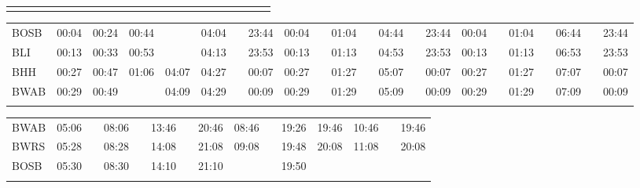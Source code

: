 \begin{center}
\begin{tabular}
\begin{tabular}
\begin{tabular}{!{\color{blaulilas}\vrule width 3pt}l!{\color{blaulilas}\vrule width 3pt}*{6}{c|}c!{\color{blaulilas}\vrule width 3pt}*{2}{*{7}{c|}c!{\color{blaulilas}\vrule width 3pt}}}
\myhline
\end{tabular}
\begin{tabular}{!{\color{blaulilas}\vrule width 3pt}l!{\color{blaulilas}\vrule width 3pt}*{3}{*{6}{c|}c!{\color{blaulilas}\vrule width 3pt}}}
\hline
{}
 &  &  \\
\hline
BOSB     &
00:04 & 00:24 & 00:44 &       & 04:04 &  & 23:44 &
00:04 &  & 01:04 &          & 04:44 &  & 23:44 &
00:04 &  & 01:04 &          & 06:44 &  & 23:44 \\
BLI      &
00:13 & 00:33 & 00:53 &       & 04:13 & \bls{}   & 23:53 &
00:13 & \bls{}   & 01:13 &  & 04:53 & \bls{}   & 23:53 &
00:13 & \bls{}   & 01:13 &  & 06:53 & \bls{}   & 23:53 \\
BHH      &
00:27 & 00:47 & 01:06 & 04:07 & 04:27 & \bls{}   & 00:07 &
00:27 & \bls{}   & 01:27 & \bls{}   & 05:07 & \bls{}   & 00:07 &
00:27 & \bls{}   & 01:27 & \bls{}   & 07:07 & \bls{}   & 00:07 \\
BWAB     &
00:29 & 00:49 &       & 04:09 & 04:29 & \bls{}   & 00:09 &
00:29 & \bls{}   & 01:29 & \bls{}   & 05:09 & \bls{}   & 00:09 &
00:29 & \bls{}   & 01:29 & \bls{}   & 07:09 & \bls{}   & 00:09 \\
\myhline
\end{tabular}
\fi
\iftapir
\begin{tabular}{!{\color{blaulilas}\vrule width 3pt}l!{\color{blaulilas}\vrule width 3pt}*{6}{c|}c!{\color{blaulilas}\vrule width 3pt}*{3}{c|}c!{\color{blaulilas}\vrule width 3pt}*{2}{c|}c!{\color{blaulilas}\vrule width 3pt}}
\hline
{}
 &  &  \\
\hline
BWAB     &
05:06 &  & 08:06 &  & 13:46 &  & 20:46 &
08:46 &  & 19:26 & 19:46 &
10:46 &  & 19:46 \\
BWRS     &
05:28 & \bls{}   & 08:28 & \bls{}   & 14:08 & \bls{}   & 21:08 &
09:08 & \bls{}   & 19:48 & 20:08 &
11:08 & \bls{}   & 20:08 \\
BOSB     &
05:30 & \bls{}   & 08:30 &          & 14:10 & \bls{}   & 21:10 &
      &          & 19:50 &       &
      &          &       \\
\myhline
\end{tabular}
\begin{tabular}{!{\color{blaulilas}\vrule width 3pt}l!{\color{blaulilas}\vrule width 3pt}*{8}{c|}c!{\color{blaulilas}\vrule width 3pt}*{4}{c|}c!{\color{blaulilas}\vrule width 3pt}*{4}{c|}c!{\color{blaulilas}\vrule width 3pt}}

\end{tabular}
\end{tabular}
\end{tabular}
\end{center}
